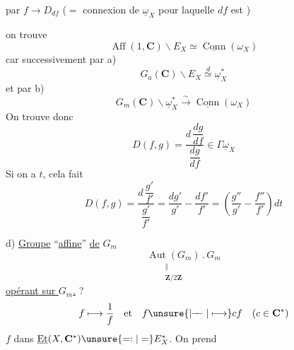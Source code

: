 par $f\longrightarrow D_{df}$ ($=$ connexion de $\underline\omega_X$
pour laquelle  $df$ est
)

on trouve
\[
\operatorname{Aff}(1,\mathbf C)\backslash E_X
\simeq\underline{\operatorname{Conn}}(\omega_X)
\]
car successivement par a)
\[
G_a(\mathbf C)\backslash E_X\overset{d}{\simeq}\underline\omega_X^*
\]
et par b)
\[
G_m(\mathbf C)\backslash\underline\omega_X^*
\overset{\sim}{\longrightarrow}\underline{\operatorname{Conn}}(\omega_X)
\]
On trouve donc
\[
D(f,g)=\frac{d\,\dfrac{dg}{df}}{\dfrac{dg}{df}}
\in\Gamma\underline\omega_X
\]
Si on a  $t$, cela fait
\[
D(f,g)=\frac{d\,\dfrac{g'}{f'}}{\dfrac{g'}{f'}}
=\frac{dg'}{g'}-\frac{df'}{f'}
=\left(\frac{g''}{g'}-\frac{f''}{f'}\right)dt
\]


d)  \uline{Groupe} ``\uline{affine}'' \uline{de} $G_m$
\[
\underset{\substack{\Vert\\\mathbf Z/2\mathbf Z}}{\operatorname{Aut}(G_m)}
\mathbin{.}G_m
\]
\uline{opérant sur $G_m$.} ?
\[
f\longmapsto\frac1f\quad\text{et}\quad
f\unsure{\mathrel{\mid\!\!-\!\!-}|\longmapsto}cf
\quad(c\in\mathbf C^*)
\]
$f$ dans $\underline{\operatorname{Et}}(X,\mathbf C^*)
\unsure{\mathrel{=:}|=}E_X^*$. On prend


